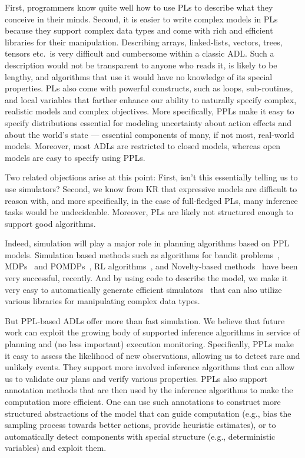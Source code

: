 \documentclass[letterpaper]{article} %
\theoremstyle{definition}
\begin{document}
First, programmers know quite well how to use PLs to describe what they conceive in their minds. Second, it is  easier to write complex models in PLs because
they support complex data types and come with rich and efficient libraries for their manipulation. Describing arrays, linked-lists, vectors, trees, tensors etc.~is very difficult and cumbersome within a classic ADL. Such a description would not be transparent to anyone who reads it, is likely to be lengthy, and algorithms that use it would have no knowledge of its special properties. PLs also come with powerful constructs, such as loops, sub-routines, and local variables
that farther enhance our ability to naturally specify complex, realistic models and complex objectives. 
More specifically, PPLs make it easy to specify distributions essential for modeling uncertainty about action effects and about the world's state --- essential components of many, if not most, real-world models. Moreover, most ADLs are restricted to closed models, whereas open models are easy to specify using PPLs.

Two related objections arise at this point: First, isn't this essentially telling us to use simulators? Second, we know from KR that expressive models are difficult to reason with, and more specifically,
in the case of full-fledged PLs, many inference tasks would be undecideable. Moreover, PLs are likely not structured enough to support good algorithms.

Indeed, simulation will play
a major role in planning algorithms based on PPL models. Simulation based methods such as algorithms for bandit problems~\cite{UCB},
MDPs~\cite{Puterman} and POMDPs~\cite{SV10,Despot}, RL algorithms~\cite{RLBook}, and Novelty-based methods~\cite{Novelty} have been very successful, recently.
And by using code to describe the model, we make it very easy to automatically generate efficient simulators~\cite{AOS-WS22} that can also 
utilize various libraries for manipulating complex data types.

But PPL-based ADLs offer more than fast simulation.
We believe that future work can 
exploit the growing body of supported inference algorithms  in service of planning and (no less important) execution monitoring. Specifically, PPLs make it easy to assess the
likelihood of new observations, allowing us to detect rare and unlikely events. They support more involved inference algorithms that can allow us to validate our plans and verify various properties.
PPLs also support annotation methods that are then used by the inference algorithms to make the computation more efficient.
One can use such annotations to construct more structured abstractions of the model that can guide computation (e.g., bias the sampling process towards better actions,
provide heuristic estimates), or to automatically detect components with special structure (e.g., deterministic variables) and exploit them.
\end{document}
